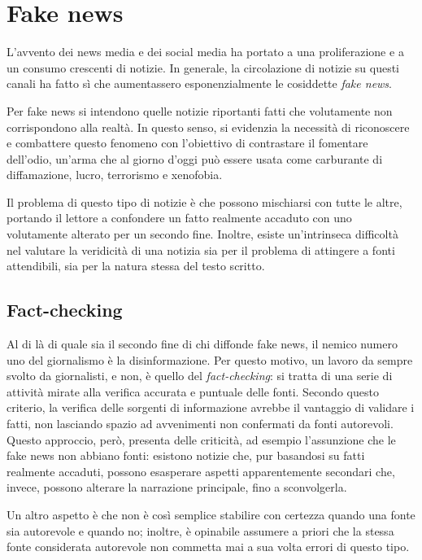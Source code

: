 \documentclass[12pt]{report}
\theoremstyle{definition}
\begin{document}
\section{Fake news} \label{fakenews}
L'avvento dei news media e dei social media ha portato a una proliferazione e a un consumo crescenti di notizie.
In generale, la circolazione di notizie su questi canali ha fatto sì che aumentassero esponenzialmente le cosiddette \textit{fake news}.

Per fake news si intendono quelle notizie riportanti fatti che volutamente non corrispondono alla realtà.
In questo senso, si evidenzia la necessità di riconoscere e combattere questo fenomeno con l'obiettivo di contrastare il fomentare dell'odio, un'arma che al giorno d'oggi può essere usata come carburante di diffamazione, lucro, terrorismo e xenofobia.

Il problema di questo tipo di notizie è che possono mischiarsi con tutte le altre, portando il lettore a confondere un fatto realmente accaduto con uno volutamente alterato per un secondo fine.
Inoltre, esiste un'intrinseca difficoltà nel valutare la veridicità di una notizia sia per il problema di attingere a fonti attendibili, sia per la natura stessa del testo scritto.

\subsection{Fact-checking} \label{factchecking}
Al di là di quale sia il secondo fine di chi diffonde fake news, il nemico numero uno del giornalismo è la disinformazione.
Per questo motivo, un lavoro da sempre svolto da giornalisti, e non, è quello del \textit{fact-checking}: si tratta di una serie di attività mirate alla verifica accurata e puntuale delle fonti.
Secondo questo criterio, la verifica delle sorgenti di informazione avrebbe il vantaggio di validare i fatti, non lasciando spazio ad avvenimenti non confermati da fonti autorevoli.
Questo approccio, però, presenta delle criticità, ad esempio l'assunzione che le fake news non abbiano fonti: 
esistono notizie che, pur basandosi su fatti realmente accaduti, possono esasperare aspetti apparentemente secondari che, invece, possono alterare la narrazione principale, fino a sconvolgerla.

Un altro aspetto è che non è così semplice stabilire con certezza quando una fonte sia autorevole e quando no; inoltre, è opinabile assumere a priori che la stessa fonte considerata autorevole non commetta mai a sua volta errori di questo tipo.
\end{document}
